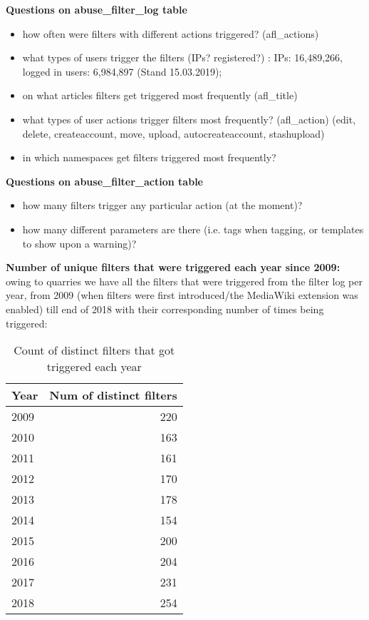 \textbf{Questions on abuse\_filter\_log table}
\begin{itemize}
    \item how often were filters with different actions triggered? (afl\_actions)
    \item what types of users trigger the filters (IPs? registered?) : IPs: 16,489,266, logged in users: 6,984,897 (Stand 15.03.2019);
    \item on what articles filters get triggered most frequently (afl\_title)
    \item what types of user actions trigger filters most frequently? (afl\_action) (edit, delete, createaccount, move, upload, autocreateaccount, stashupload)
    \item in which namespaces get filters triggered most frequently?
\end{itemize}

\textbf{Questions on abuse\_filter\_action table}
\begin{itemize}
    \item how many filters trigger any particular action (at the moment)?
    \item how many different parameters are there (i.e. tags when tagging, or templates to show upon a warning)?
\end{itemize}

\textbf{Number of unique filters that were triggered each year since 2009:}
owing to quarries we have all the filters that were triggered from the filter log per year, from 2009 (when filters were first introduced/the MediaWiki extension was enabled) till end of 2018 with their corresponding number of times being triggered:
\begin{table}
  \centering
  \begin{tabular}{l r }
    Year & Num of distinct filters \\
    \hline
    2009 & 220 \\
    2010 & 163 \\
    2011 & 161 \\
    2012 & 170 \\
    2013 & 178 \\
    2014 & 154 \\
    2015 & 200 \\
    2016 & 204 \\
    2017 & 231 \\
    2018 & 254 \\
  \end{tabular}
  \caption{Count of distinct filters that got triggered each year}~\label{tab:active-filters-count}
\end{table}

